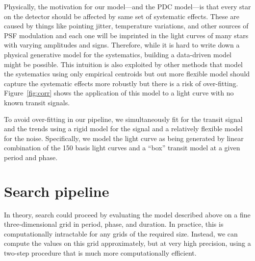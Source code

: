 \documentclass[12pt,preprint]{aastex}
\newcommand{\figref}[1]{\ref{fig:#1}}
\newcommand{\Fig}[1]{Figure~\figref{#1}}
\begin{document}
Physically, the motivation for our model---and the PDC model---is that every
star on the detector should be affected by same set of systematic effects.
These are caused by things like pointing jitter, temperature variations, and
other sources of PSF modulation and each one will be imprinted in the light
curves of many stars with varying amplitudes and signs.
Therefore, while it is hard to write down a physical generative model for the
systematics, building a data-driven model might be possible.
This intuition is also exploited by other methods that model the systematics
using only empirical centroids \citep{vanderberg-a, crossfield} but out more
flexible model should capture the systematic effects more robustly but there
is a risk of over-fitting.
\Fig{corr} shows the application of this model to a light curve with no known
transit signals.

To avoid over-fitting in our pipeline, we simultaneously fit for the transit
signal and the trends using a rigid model for the signal and a relatively
flexible model for the noise.
Specifically, we model the light curve as being generated by linear
combination of the 150 basis light curves and a ``box'' transit model at a
given period and phase.


\section{Search pipeline}

In theory, search could proceed by evaluating the model described above on a
fine three-dimensional grid in period, phase, and duration.
In practice, this is computationally intractable for any grids of the
required size.
Instead, we can compute the values on this grid approximately, but at very
high precision, using a two-step procedure that is much more computationally
efficient.
\end{document}
